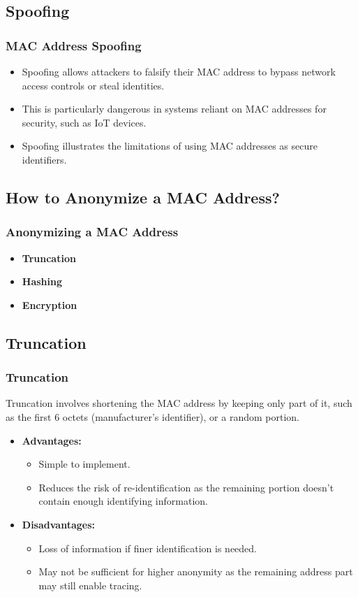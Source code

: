 \documentclass[
	11pt, %
]{beamer}
\begin{document}
\begin{frame}
  \section{Spoofing}
  \frametitle{MAC Address Spoofing}
  \begin{itemize}
    \item Spoofing allows attackers to falsify their MAC address to bypass network access controls or steal identities. \pause
    \item This is particularly dangerous in systems reliant on MAC addresses for security, such as IoT devices. \pause
    \item Spoofing illustrates the limitations of using MAC addresses as secure identifiers. 
  \end{itemize}
\end{frame}

\begin{frame}
  \section{How to Anonymize a MAC Address?}
  \frametitle{Anonymizing a MAC Address}
  \begin{itemize}
    \item \textbf{Truncation} \pause
    \item \textbf{Hashing} \pause
    \item \textbf{Encryption} 
  \end{itemize}
\end{frame}

\begin{frame}
  \section{Truncation}
  \frametitle{Truncation}
  Truncation involves shortening the MAC address by keeping only part of it, such as the first 6 octets (manufacturer's identifier), or a random portion.
  \begin{itemize}
    \item \textbf{Advantages:} \pause
      \begin{itemize}
        \item Simple to implement. \pause
        \item Reduces the risk of re-identification as the remaining portion doesn't contain enough identifying information. \pause
      \end{itemize}
    \item \textbf{Disadvantages:} \pause
      \begin{itemize}
        \item Loss of information if finer identification is needed. \pause
        \item May not be sufficient for higher anonymity as the remaining address part may still enable tracing. 
      \end{itemize}
  \end{itemize}
\end{frame}
\end{document}
